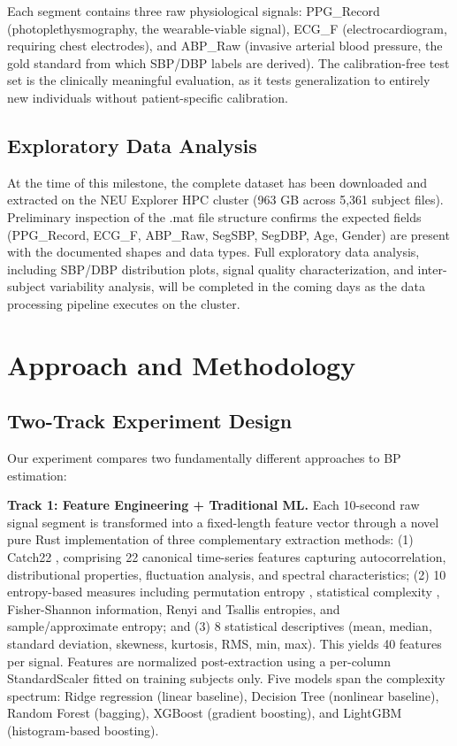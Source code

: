 \documentclass[11pt]{article}
\begin{document}
Each segment contains three raw physiological signals: PPG\_Record (photoplethysmography, the wearable-viable signal), ECG\_F (electrocardiogram, requiring chest electrodes), and ABP\_Raw (invasive arterial blood pressure, the gold standard from which SBP/DBP labels are derived). The calibration-free test set is the clinically meaningful evaluation, as it tests generalization to entirely new individuals without patient-specific calibration.

\subsection{Exploratory Data Analysis}

At the time of this milestone, the complete dataset has been downloaded and extracted on the NEU Explorer HPC cluster (963 GB across 5,361 subject files). Preliminary inspection of the .mat file structure confirms the expected fields (PPG\_Record, ECG\_F, ABP\_Raw, SegSBP, SegDBP, Age, Gender) are present with the documented shapes and data types. Full exploratory data analysis, including SBP/DBP distribution plots, signal quality characterization, and inter-subject variability analysis, will be completed in the coming days as the data processing pipeline executes on the cluster.

\section{Approach and Methodology}

\subsection{Two-Track Experiment Design}

Our experiment compares two fundamentally different approaches to BP estimation:

\textbf{Track 1: Feature Engineering + Traditional ML.} Each 10-second raw signal segment is transformed into a fixed-length feature vector through a novel pure Rust implementation of three complementary extraction methods: (1) Catch22 \citep{lubba2019catch22}, comprising 22 canonical time-series features capturing autocorrelation, distributional properties, fluctuation analysis, and spectral characteristics; (2) 10 entropy-based measures including permutation entropy \citep{bandt2002permutation}, statistical complexity \citep{rosso2007distinguishing}, Fisher-Shannon information, Renyi and Tsallis entropies, and sample/approximate entropy; and (3) 8 statistical descriptives (mean, median, standard deviation, skewness, kurtosis, RMS, min, max). This yields 40 features per signal. Features are normalized post-extraction using a per-column StandardScaler fitted on training subjects only. Five models span the complexity spectrum: Ridge regression (linear baseline), Decision Tree (nonlinear baseline), Random Forest (bagging), XGBoost (gradient boosting), and LightGBM (histogram-based boosting).
\end{document}
